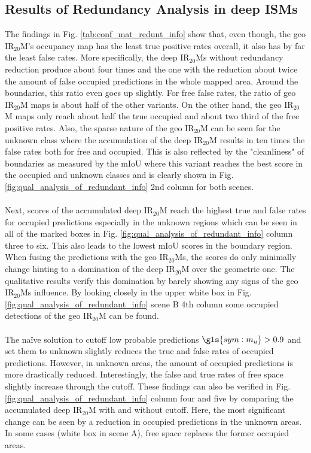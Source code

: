 \subsection{Results of Redundancy Analysis in deep ISMs}
\label{subsec:results_of_red_analy}
The findings in Fig. \ref{tab:conf_mat_redunt_info} show that, even though, the geo IR$_{20}$M's occupancy map has the least true positive rates overall, it also has by far the least false rates. More specifically, the deep IR$_{20}$Ms without redundancy reduction produce about four times and the one with the reduction about twice the amount of false occupied predictions in the whole mapped area. Around the boundaries, this ratio even goes up slightly. For free false rates, the ratio of geo IR$_{20}$M maps is about half of the other variants. On the other hand, the geo IR$_{20}$M maps only reach about half the true occupied and about two third of the free positive rates. Also, the sparse nature of the geo IR$_{20}$M can be seen for the unknown class where the accumulation of the deep IR$_{20}$M results in ten times the false rates both for free and occupied. This is also reflected by the "cleanliness" of boundaries as measured by the mIoU where this variant reaches the best score in the occupied and unknown classes and is clearly shown in Fig. \ref{fig:qual_analysis_of_redundant_info} 2nd column for both scenes.
\\\\
Next, scores of the accumulated deep IR$_{20}$M reach the highest true and false rates for occupied predictions especially in the unknown regions which can be seen in all of the marked boxes in Fig. \ref{fig:qual_analysis_of_redundant_info} column three to six. This also leads to the lowest mIoU scores in the boundary region. When fusing the predictions with the geo IR$_{20}$Ms, the scores do only minimally change hinting to a domination of the deep IR$_{20}$M over the geometric one. The qualitative results verify this domination by barely showing any signs of the geo IR$_{20}$Ms influence. By looking closely in the upper white box in Fig. \ref{fig:qual_analysis_of_redundant_info} scene B 4th column some occupied detections of the geo IR$_{20}$M can be found.
\\\\
The na\"ive solution to cutoff low probable predictions $\gls{sym:m_u} > 0.9$ and set them to unknown slightly reduces the true and false rates of occupied predictions. However, in unknown areas, the amount of occupied predictions is more drastically reduced. Interestingly, the false and true rates of free space slightly increase through the cutoff. These findings can also be verified in Fig. \ref{fig:qual_analysis_of_redundant_info} column four and five by comparing the accumulated deep IR$_{20}$M with and without cutoff. Here, the most significant change can be seen by a reduction in occupied predictions in the unknown areas. In some cases (white box in scene A), free space replaces the former occupied areas.
